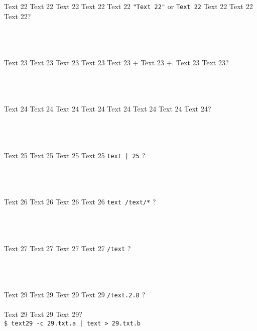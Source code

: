 \documentclass[9pt]{exam}
\begin{document}
\begin{questions}
\question
    Text 22 Text 22 Text 22 Text 22 Text 22 \texttt{"Text 22"}
    or
    \texttt{\textquotesingle{}Text 22\textquotesingle{}}
    Text 22 Text 22 Text 22?\\\\
    \makebox[0.9\textwidth]{\$ \enspace\hrulefill}\\\\
    \makebox[0.9\textwidth]{\enspace\hrulefill}

\question
    Text 23 Text 23 Text 23 Text 23 Text 23 \Ctrl+
    Text 23 \Ctrl+. Text 23 Text 23?\\\\
    \makebox[0.9\textwidth]{\$ \enspace\hrulefill}\\\\
    \makebox[0.9\textwidth]{\enspace\hrulefill}

\question
    Text 24 Text 24 Text 24 Text 24 Text 24 Text 24 Text 24 Text 24?\\\\
    \makebox[0.9\textwidth]{\$ \enspace\hrulefill}\\\\
    \makebox[0.9\textwidth]{\enspace\hrulefill}

\question
    Text 25 Text 25 Text 25 Text 25 \textquotesingle{}\texttt{text | 25}\textquotesingle{} ?\\\\
    \makebox[0.9\textwidth]{\$ \enspace\hrulefill}\\\\
    \makebox[0.9\textwidth]{\enspace\hrulefill}

\question
    Text 26 Text 26 Text 26 Text 26 \textquotesingle{}\texttt{text /text/*}\textquotesingle{} ?\\\\
    \makebox[0.9\textwidth]{\$ \enspace\hrulefill}\\\\
    \makebox[0.9\textwidth]{\enspace\hrulefill}

\question
    Text 27 Text 27 Text 27 Text 27 \texttt{/text} ?\\\\
    \makebox[0.9\textwidth]{\$ \enspace\hrulefill}\\\\
    \makebox[0.9\textwidth]{\enspace\hrulefill}

\question
    Text 29 Text 29 Text 29 Text 29 \texttt{/text.2.8} ?\\\\
    Text 29 Text 29 Text 29?\\
    \makebox[0.05\textwidth]{}
    \texttt{\$ text29 -c 29.txt.a | text > 29.txt.b}\\\\
    \makebox[0.9\textwidth]{\$ \enspace\hrulefill}\\\\
    \makebox[0.9\textwidth]{\enspace\hrulefill}


\end{questions}
\end{document}
